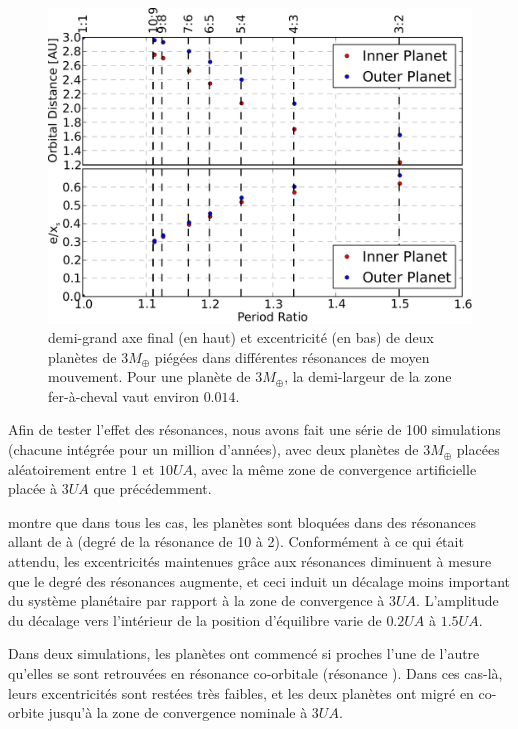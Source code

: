 \begin{figure}[htbp]
\centering
\includegraphics[width=0.95\linewidth]{figure/shifted/influence_of_MMR.pdf}
\caption[Effet de l'ordre de la résonance sur la zone de stabilité d'un système résonant.]{demi-grand axe final (en haut) et
excentricité (en bas) de deux planètes de $3\unit{M_\oplus}$ piégées dans différentes résonances de moyen mouvement. Pour une
planète de $3\unit{M_\oplus}$, la demi-largeur de la zone fer-à-cheval vaut environ $0.014$.}\label{fig:influence_of_MMR}
\end{figure}

Afin de tester l'effet des résonances, nous avons fait une série de 100 simulations (chacune intégrée pour un million d'années),
avec deux planètes de $3\unit{M_\oplus}$ placées aléatoirement entre $1$ et $10\unit{UA}$, avec la même zone de convergence
artificielle placée à $3\unit{UA}$ que précédemment. 

 montre que dans tous les cas, les planètes sont bloquées dans des résonances allant de  à  (degré de la résonance de 10 à 2). Conformément à ce qui était attendu, les excentricités maintenues grâce aux résonances diminuent à mesure que le degré des résonances augmente, et ceci induit un décalage moins important du système planétaire par rapport à la zone de convergence à $3\unit{UA}$. L'amplitude du décalage vers l'intérieur de la position d'équilibre varie de $0.2\unit{UA}$ à $1.5\unit{UA}$. 

Dans deux simulations, les planètes ont commencé si proches l'une de l'autre qu'elles se sont retrouvées en résonance
co-orbitale (résonance ). Dans ces cas-là, leurs excentricités sont restées très faibles, et les deux planètes ont
migré en co-orbite jusqu'à la zone de convergence nominale à $3\unit{UA}$. 

